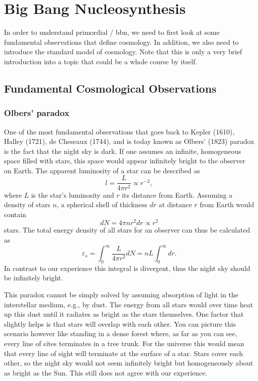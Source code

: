 
\chapter{Big Bang Nucleosynthesis}\label{ch:bbn}

In order to understand primordial / \acf{bbn}, we need to first look at some fundamental observations that define cosmology. In addition, we also need to introduce the standard model of cosmology. Note that this is only a very brief introduction into a topic that could be a whole course by itself.

\section{Fundamental Cosmological Observations}

\subsection{Olbers' paradox}

One of the most fundamental observations that goes back to Kepler (1610), Halley (1721), de Cheseaux (1744), and is today known as Olbers' (1823) paradox is the fact that the night sky is dark. If one assumes an infinite, homogeneous space filled with stars, this space would appear infinitely bright to the observer on Earth. The apparent luminosity of a star can be described as
\begin{equation}\label{eqn:bbn:relative_luminosity}
    l = \frac{L}{4 \pi r^{2}} \propto r^{-2},
\end{equation}
where $L$ is the star's luminosity and $r$ its distance from Earth. Assuming a density of stars $n$, a spherical shell of thickness $dr$ at distance $r$ from Earth would contain
\begin{equation}
    dN = 4 \pi n r^2 dr \propto r^2
\end{equation}
stars. The total energy density of all stars for an observer can thus be calculated as
\begin{equation}\label{eqn:bbn:total_energy_density}
    \varepsilon_s = \int_0^{\infty} \frac{L}{4\pi r^2} dN = nL \int_{0}^{\infty} dr.
\end{equation}
In contrast to our experience this integral is divergent, thus the night sky should be infinitely bright. 

This paradox cannot be simply solved by assuming absorption of light in the interstellar medium, e.g., by dust. The energy from all stars would over time heat up this dust until it radiates as bright as the stars themselves. One factor that slightly helps is that stars will overlap with each other. You can picture this scenario however like standing in a dense forest where, as far as you can see, every line of sites terminates in a tree trunk. For the universe this would mean that every line of sight will terminate at the surface of a star. Stars cover each other, so the night sky would not seem infinitely bright but homogeneously about as bright as the Sun. This still does not agree with our experience.


